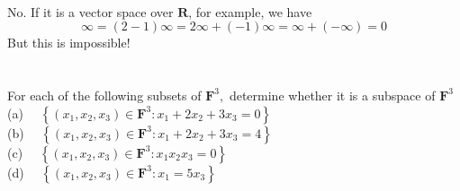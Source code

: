 \documentclass[a4paper]{article}
\begin{document}
\paragraph{}

No. If it is a vector space over $\mathbf{R}$, for example, we have
\[
    \infty = (2 - 1)\infty = 2\infty + (-1)\infty = \infty + (-\infty) = 0
\]
But this is impossible!

\section{}
\subsection{}
For each of the following subsets of $\mathbf{F}^{3},$ determine whether it is a subspace of $\mathbf{F}^{3}$\\
(a) $\quad\left\{\left(x_{1}, x_{2}, x_{3}\right) \in \mathbf{F}^{3}: x_{1}+2 x_{2}+3 x_{3}=0\right\}$ \\
(b) $\quad\left\{\left(x_{1}, x_{2}, x_{3}\right) \in \mathbf{F}^{3}: x_{1}+2 x_{2}+3 x_{3}=4\right\}$ \\
(c) $\quad\left\{\left(x_{1}, x_{2}, x_{3}\right) \in \mathbf{F}^{3}: x_{1} x_{2} x_{3}=0\right\}$ \\
(d) $\quad\left\{\left(x_{1}, x_{2}, x_{3}\right) \in \mathbf{F}^{3}: x_{1}=5 x_{3}\right\}$
\end{document}
